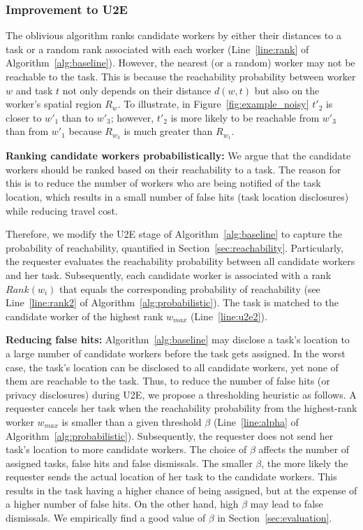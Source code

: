 \documentclass{USC-Thesis}
\numberwithin{equation}{chapter}
\begin{document}
\subsubsection{Improvement to U2E}
\label{sec:u2e_improve}

The oblivious algorithm ranks candidate workers by either their distances to a task or a random rank associated with each worker (Line~\ref{line:rank} of Algorithm~\ref{alg:baseline}). However, the nearest (or a random) worker may not be reachable to the task. This is because the reachability probability between worker $w$ and task $t$ not only depends on their distance $d(w,t)$ but also on the worker's spatial region $R_w$. To illustrate, in Figure~\ref{fig:example_noisy} $t'_2$ is closer to $w'_1$ than to $w'_3$; however, $t'_2$ is more likely to be reachable from $w'_3$ than from $w'_1$ because $R_{w_3}$ is much greater than $R_{w_1}$.

\textbf{Ranking candidate workers probabilistically:}
We argue that the candidate workers should be ranked based on their reachability to a task. The reason for this is to reduce the number of workers who are being notified of the task location, which results in a small number of false hits (task location disclosures) while reducing travel cost.

Therefore, we modify the U2E stage of Algorithm~\ref{alg:baseline} to capture the probability of reachability, quantified in Section~\ref{sec:reachability}.
Particularly, the requester evaluates the reachability probability between all candidate workers and her task. Subsequently, each candidate worker is associated with a rank $Rank(w_i)$ that equals the corresponding probability of reachability (see Line~\ref{line:rank2} of Algorithm~\ref{alg:probabilistic}). The task is matched to the candidate worker of the highest rank $w_{max}$ (Line~\ref{line:u2e2}).

\textbf{Reducing false hits:} Algorithm~\ref{alg:baseline} may disclose a task's location to a large number of candidate workers before the task gets assigned. In the worst case, the task's location can be disclosed to all candidate workers, yet none of them are reachable to the task. Thus, to reduce the number of false hits (or privacy disclosures) during U2E, we propose a thresholding heuristic as follows. A requester cancels her task when the reachability probability from the highest-rank worker $w_{max}$ is smaller than a given threshold $\beta$ (Line~\ref{line:alpha} of Algorithm~\ref{alg:probabilistic}). Subsequently, the requester does not send her task's location to more candidate workers. The choice of $\beta$ affects the number of assigned tasks, false hits and false dismissals. The smaller $\beta$, the more likely the requester sends the actual location of her task to the candidate workers. This results in the task having a higher chance of being assigned, but at the expense of a higher number of false hits. On the other hand, high $\beta$ may lead to false dismissals. We empirically find a good value of $\beta$ in Section~\ref{sec:evaluation}.
\end{document}
